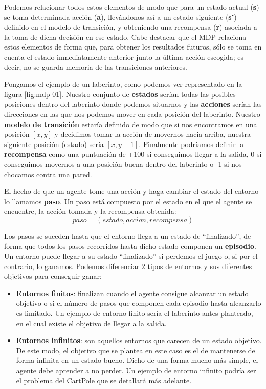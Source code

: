 Podemos relacionar todos estos elementos de modo que para un estado actual (\textbf{s}) se toma determinada acción (\textbf{a}), llevándonos así a un estado siguiente (\textbf{s'}) definido en el modelo de transición, y obteniendo una recompensa (\textbf{r}) asociada a la toma de dicha decisión en ese estado. Cabe destacar que el MDP relaciona estos elementos de forma que, para obtener los resultados futuros, sólo se toma en cuenta el estado inmediatamente anterior junto la última acción escogida; es decir, no se guarda memoria de las transiciones anteriores. 

Pongamos el ejemplo de un laberinto, como podemos ver representado en la figura \ref{fig:mdp-01}. Nuestro conjunto de \textbf{estados} serían todas las posibles posiciones dentro del laberinto donde podemos situarnos y las \textbf{acciones} serían las direcciones en las que nos podemos mover en cada posición del laberinto. Nuestro \textbf{modelo de transición} estaría definido de modo que si nos encontramos en una posición $[x, y]$ y decidimos tomar la acción de movernos hacia arriba, nuestra siguiente posición (estado) sería $[x, y+1]$. Finalmente podríamos definir la \textbf{recompensa} como una puntuación de +100 si conseguimos llegar a la salida, 0 si conseguimos movernos a una posición buena dentro del laberinto o -1 si nos chocamos contra una pared.


El hecho de que un agente tome una acción y haga cambiar el estado del entorno lo llamamos \textbf{paso}. Un paso está compuesto por el estado en el que el agente se encuentre, la acción tomada y la recompensa obtenida: $$paso = (estado, accion, recompensa)$$


Los pasos se suceden hasta que el entorno llega a un estado de “finalizado”, de forma que todos los pasos recorridos hasta dicho estado componen un \textbf{episodio}. Un entorno puede llegar a su estado “finalizado” si perdemos el juego o, si por el contrario, lo ganamos. Podemos diferenciar 2 tipos de entornos y sus diferentes objetivos para conseguir ganar:

\begin{itemize}
    \item \textbf{Entornos finitos}: finalizan cuando el agente consigue alcanzar un estado objetivo o si el número de pasos que componen cada episodio hasta alcanzarlo es limitado. Un ejemplo de entorno finito sería el laberinto antes planteado, en el cual existe el objetivo de llegar a la salida.
    \item \textbf{Entornos infinitos}: son aquellos entornos que carecen de un estado objetivo. De este modo, el objetivo que se plantea en este caso es el de mantenerse de forma infinita en un estado bueno. Dicho de una forma mucho más simple, el agente debe aprender a no perder. Un ejemplo de entorno infinito podría ser el problema del CartPole que se detallará más adelante.
\end{itemize}

